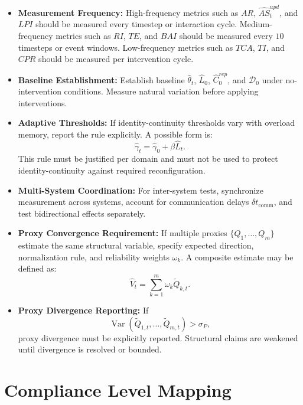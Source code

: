 \documentclass[11pt,a4paper]{article}
\DeclareMathOperator{\Var}{Var}
\theoremstyle{breakstyle}
\newcommand{\Dadm}{\mathcal{D}}
\newcommand{\Chat}{\widehat{C}}
\newcommand{\Lhat}{\widehat{L}}
\newcommand{\thetahat}{\widehat{\theta}}
\begin{document}
	\begin{itemize}
		\item \textbf{Measurement Frequency:} High-frequency metrics such as $AR$, $\widehat{AS}^{upd}_t$, and $LPI$ should be measured every timestep or interaction cycle. Medium-frequency metrics such as $RI$, $TE$, and $BAI$ should be measured every $10$ timesteps or event windows. Low-frequency metrics such as $TCA$, $TI$, and $CPR$ should be measured per intervention cycle.
		
		\item \textbf{Baseline Establishment:} Establish baseline $\thetahat_t$, $\Lhat_0$, $\Chat^{rep}_0$, and $\Dadm_0$ under no-intervention conditions. Measure natural variation before applying interventions.
		
		\item \textbf{Adaptive Thresholds:} If identity-continuity thresholds vary with overload memory, report the rule explicitly. A possible form is:
		\[
		\hat{\gamma}_t = \hat{\gamma}_0 + \beta \Lhat_t.
		\]
		This rule must be justified per domain and must not be used to protect identity-continuity against required reconfiguration.
		
		\item \textbf{Multi-System Coordination:} For inter-system tests, synchronize measurement across systems, account for communication delays $\delta t_{\mathrm{comm}}$, and test bidirectional effects separately.
		
		\item \textbf{Proxy Convergence Requirement:} If multiple proxies $\{Q_1,\dots,Q_m\}$ estimate the same structural variable, specify expected direction, normalization rule, and reliability weights $\omega_k$. A composite estimate may be defined as:
		\[
		\widehat{V}_t =
		\sum_{k=1}^{m}\omega_k\widetilde{Q}_{k,t}.
		\]
		
		\item \textbf{Proxy Divergence Reporting:} If
		\[
		\Var(\widetilde{Q}_{1,t},\dots,\widetilde{Q}_{m,t}) > \sigma_P,
		\]
		proxy divergence must be explicitly reported. Structural claims are weakened until divergence is resolved or bounded.
	\end{itemize}
	
	\section{Compliance Level Mapping}
	
\end{document}
